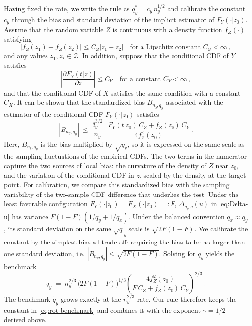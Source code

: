 \documentclass[11pt]{article}
\numberwithin{equation}{section}
\begin{document}
Having fixed the rate, we write the rule as $q_y^* = c_y\, n_y^{1/2}$ and calibrate the constant $c_y$ through the bias and standard deviation of the implicit estimator of $F_Y(\cdot|z_0)$. Assume that the random variable $Z$ is continuous with a density function $f_Z(\cdot)$ satisfying
\begin{equation*}
 |f_Z(z_1) - f_Z(z_2)| \le C_Z |z_1 - z_2| \quad \text{for a Lipschitz constant } C_Z < \infty~,
\end{equation*}
and any values $z_1, z_2 \in \mathcal Z$. In addition, suppose that the conditional CDF of $Y$ satisfies
\begin{equation*}
 \left| \frac{\partial F_Y(t|z)}{\partial z} \right| \le C_Y \quad \text{for a constant } C_Y < \infty~,
\end{equation*}
and that the conditional CDF of $X$ satisfies the same condition with a constant $C_X$. It can be shown that the standardized bias $B_{n_y,q_y}$ associated with the estimator of the conditional CDF $F_Y(\cdot|z_0)$ satisfies
\begin{equation}\label{eq:rot-bias}
 |B_{n_y,q_y}| \;\le\; \frac{q_y^{3/2}}{n_y}\cdot \frac{F_Y(t|z_0)\, C_Z + f_Z(z_0)\, C_Y}{4 f_Z^2(z_0)}~.
\end{equation}
Here, $B_{n_y,q_y}$ is the bias multiplied by $\sqrt{q_y}$, so it is expressed on the same scale as the sampling fluctuations of the empirical CDFs. The two terms in the numerator capture the two sources of local bias: the curvature of the density of $Z$ near $z_0$, and the variation of the conditional CDF in $z$, scaled by the density at the target point. For calibration, we compare this standardized bias with the sampling variability of the two-sample CDF difference that underlies the test. Under the least favorable configuration $F_Y(\cdot|z_0) = F_X(\cdot|z_0) =: F$, $\Delta_{q_y,q}(u)$ in \eqref{eq:Delta-u} has variance $F(1-F)(1/q_y + 1/q_x)$. Under the balanced convention $q_x \approx q_y$, its standard deviation on the same $\sqrt q_y$ scale is $\sqrt{2F(1-F)}$. We calibrate the constant by the simplest bias-sd trade-off: requiring the bias to be no larger than one standard deviation, i.e. $|B_{n_y,q_y}| \le \sqrt{2F(1-F)}$. Solving for $q_y$ yields the benchmark
\begin{equation}\label{eq:rot-benchmark}
 \tilde q_y \;=\; n_y^{2/3}\, \big(2F(1-F)\big)^{1/3} \left( \frac{4 f_Z^2(z_0)}{F\, C_Z + f_Z(z_0)\, C_Y} \right)^{2/3}~.
\end{equation}
The benchmark $\tilde q_y$ grows exactly at the $n_y^{2/3}$ rate. Our rule therefore keeps the constant in \eqref{eq:rot-benchmark} and combines it with the exponent $\gamma = 1/2$ derived above.
\end{document}
